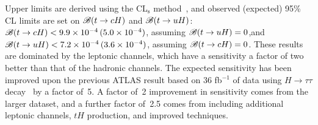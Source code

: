 Upper limits are derived using the CL$_{\textrm{s}}$ method~\cite{Junk:1999kv,Read:2002hq}, and  
observed (expected) 95\% CL limits are set on $\mathscr{B}(t\to cH)$ and $\mathscr{B}(t\to uH)$:
$\mathscr{B}(t\to cH)<9.9 \times 10^{-4}\,(5.0 \times 10^{-4})$, assuming $\mathscr{B}(t\to uH)=0$,and $\mathscr{B}(t\to uH)<7.2 \times 10^{-4}\,(3.6 \times 10^{-4})$, assuming $\mathscr{B}(t\to cH)=0$.
These results are dominated by the leptonic channels, which have a sensitivity a factor of two better than that of the hadronic channels.
The expected sensitivity has been improved upon the previous ATLAS result based on 36 fb$^{-1}$ of data using $H\to \tau\tau$ decay~\cite{fcnc36} by a factor of~5. A factor of~2 improvement in sensitivity comes from the larger dataset, and a further factor of~2.5 comes from including
additional leptonic channels, $tH$ production, and improved techniques.


